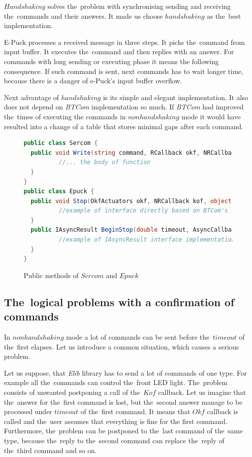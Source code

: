   $Handshaking$ solves the~problem with synchronising sending 
    and receiving the~commands and their answers. 
  It made us choose $handshaking$ as the~best implementation.

  E-Puck processes a received message in three steps. It picks the~command from input buffer.
  It executes the~command and then replies with an answer.
  For commands with long sending or executing phase it means the following consequence.
  If such command is sent, next commands has to wait longer time, because there is a
  danger of e-Puck's input buffer overflow.

  Next advantage of $handshaking$ is its simple and elegant implementation. It also does not depend on {\it BTCom} implementation so much.
  If {\it BTCom} had improved the~times of executing the commands
  in $nonhandshaking$ mode it would have resulted into a change of a table that stores minimal gaps after each command.

\begin{figure}[!hbp]
\begin{lstlisting}[language=cs]
public class Sercom {
  public void Write(string command, RCallback okf, NRCallback kof,object state, double timeout) {
          //... the body of function
  }
}
public class Epuck {
  public void Stop(OkfActuators okf, NRCallback kof, object state, double timeout) {
          //example of interface directly based on BTCom's interface
  }
  public IAsyncResult BeginStop(double timeout, AsyncCallback callback, Object state) {
          //example of IAsyncResult interface implementation
  }
}
\end{lstlisting}
\caption{Public methods of $Sercom$ and $Epuck$} \label{serep}
\end{figure}

 \subsection{The~logical problems with a confirmation of commands}\label{sec:logical}
  In $nonhandshaking$ mode a lot of commands can be sent before the~$timeout$ of the~first elapses.
  Let us introduce a common situation, which causes a serious problem. 
  
  Let us suppose, that {\it Elib} library has to send a lot of commands of one type.
  For example all the~commands can control the~front LED light.	
  The~problem consists of unwanted postponing a call of the~$Kof$ callback. 
  Let us imagine that the~answer for the~first command
  is lost, but the~second answer manage to be processed under $timeout$ of the~first command.
  It means that $Okf$ callback is called and the~user assumes that everything is fine for the first command.
  Furthermore, the~problem can be postponed to the~last command of the~same type,
  because the~reply to the~second command can replace the~reply of the~third command
  and so on.

